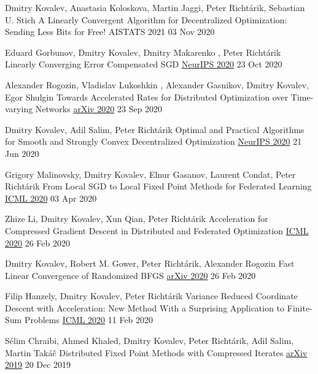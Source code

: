 \begin{cventries}
\cventry
{Dmitry Kovalev, Anastasia Koloskova, Martin Jaggi, Peter Richtárik, Sebastian U. Stich} %
{A Linearly Convergent Algorithm for Decentralized Optimization: Sending Less Bits for Free!} %
{AISTATS 2021} 
{03 Nov 2020} %
{}	

\cventry
{Eduard Gorbunov, Dmitry Kovalev, Dmitry Makarenko , Peter Richtárik} %
{Linearly Converging Error Compensated SGD} %
{\href{https://papers.nips.cc/paper/2020/hash/ef9280fbc5317f17d480e4d4f61b3751-Abstract.html}{NeurIPS 2020}} 
{23 Oct 2020} %
{}	

\cventry
{Alexander Rogozin, Vladislav Lukoshkin , Alexander Gasnikov, Dmitry Kovalev, Egor Shulgin} %
{Towards Accelerated Rates for Distributed Optimization over Time-varying Networks} %
{\href{https://arxiv.org/abs/2009.11069}{arXiv 2020}} 
{23 Sep 2020} %
{}	

\cventry
{Dmitry Kovalev, Adil Salim, Peter Richtárik} %
{Optimal and Practical Algorithms for Smooth and Strongly Convex Decentralized Optimization} %
{\href{https://papers.nips.cc/paper/2020/hash/d530d454337fb09964237fecb4bea6ce-Abstract.html}{NeurIPS 2020}} 
{21 Jun 2020} %
{}	

\cventry
{Grigory Malinovsky, Dmitry Kovalev, Elnur Gasanov, Laurent Condat, Peter Richtárik} %
{From Local SGD to Local Fixed Point Methods for Federated Learning} %
{\href{http://proceedings.mlr.press/v119/malinovskiy20a.html}{ICML 2020}} 
{03 Apr 2020} %
{}	

\cventry
{Zhize Li, Dmitry Kovalev, Xun Qian, Peter Richtárik} %
{Acceleration for Compressed Gradient Descent in Distributed and Federated Optimization} %
{\href{http://proceedings.mlr.press/v119/li20g.html}{ICML 2020}} 
{26 Feb 2020} %
{}	

\cventry
{Dmitry Kovalev, Robert M. Gower, Peter Richtárik, Alexander Rogozin} %
{Fast Linear Convergence of Randomized BFGS} %
{\href{https://arxiv.org/abs/2002.11337}{arXiv 2020}} 
{26 Feb 2020} %
{}	

\cventry
{Filip Hanzely, Dmitry Kovalev, Peter Richtárik} %
{Variance Reduced Coordinate Descent with Acceleration: New Method With a Surprising Application to Finite-Sum Problems} %
{\href{http://proceedings.mlr.press/v119/hanzely20b.html}{ICML 2020}} 
{11 Feb 2020} %
{}	

\cventry
{Sélim Chraibi, Ahmed Khaled, Dmitry Kovalev, Peter Richtárik, Adil Salim, Martin Takáč} %
{Distributed Fixed Point Methods with Compressed Iterates} %
{\href{https://arxiv.org/abs/1912.09925}{arXiv 2019}} 
{20 Dec 2019} %
{}	


\end{cventries}
